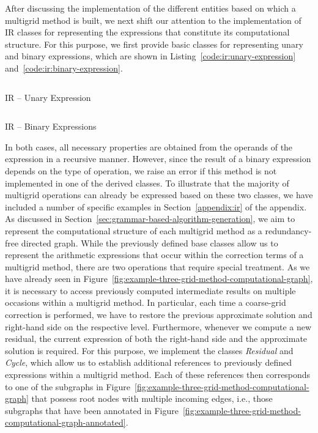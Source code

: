 After discussing the implementation of the different entities based on which a multigrid method is built, we next shift our attention to the implementation of IR classes for representing the expressions that constitute its computational structure. 
For this purpose, we first provide basic classes for representing unary and binary expressions, which are shown in Listing~\ref{code:ir:unary-expression} and~\ref{code:ir:binary-expression}.
\begin{listing}
	\inputminted{python}{evostencils/ir/unary_expression.py}
	\caption{IR -- Unary Expression}
	\label{code:ir:unary-expression}
\end{listing}
\begin{listing}
	\inputminted{python}{evostencils/ir/binary_expression.py}
	\caption{IR -- Binary Expressions}
	\label{code:ir:binary-expression}
\end{listing}
In both cases, all necessary properties are obtained from the operands of the expression in a recursive manner.
However, since the result of a binary expression depends on the type of operation, we raise an error if this method is not implemented in one of the derived classes. 
To illustrate that the majority of multigrid operations can already be expressed based on these two classes, we have included a number of specific examples in Section~\ref{appendix:ir} of the appendix.
As discussed in Section~\ref{sec:grammar-based-algorithm-generation}, we aim to represent the computational structure of each multigrid method as a redundancy-free directed graph. 
While the previously defined base classes allow us to represent the arithmetic expressions that occur within the correction terms of a multigrid method, there are two operations that require special treatment.
As we have already seen in Figure~\ref{fig:example-three-grid-method-computational-graph}, it is necessary to access previously computed intermediate results on multiple occasions within a multigrid method.
In particular, each time a coarse-grid correction is performed, we have to restore the previous approximate solution and right-hand side on the respective level.
Furthermore, whenever we compute a new residual, the current expression of both the right-hand side and the approximate solution is required.
For this purpose, we implement the classes \emph{Residual} and \emph{Cycle}, which allow us to establish additional references to previously defined expressions within a multigrid method.
Each of these references then corresponds to one of the subgraphs in Figure~\ref{fig:example-three-grid-method-computational-graph} that possess root nodes with multiple incoming edges, i.e., those subgraphs that have been annotated in Figure~\ref{fig:example-three-grid-method-computational-graph-annotated}.
